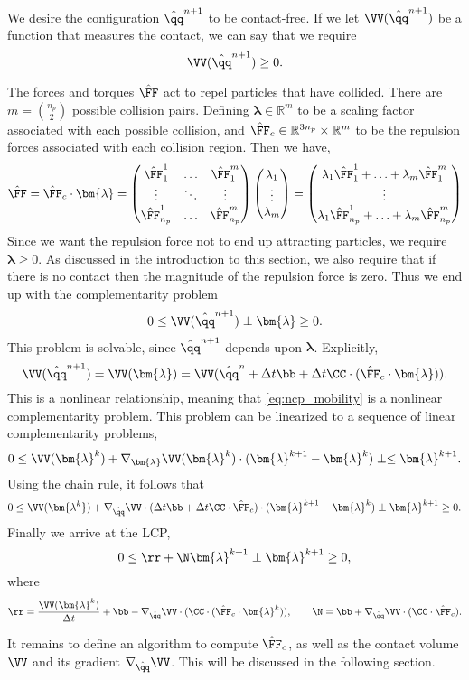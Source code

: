 We desire the configuration $\hat{\qq}^{n+1}$ to be contact-free. If we let $\VV(\hat{\qq}^{n+1})$ be a function that measures the contact, we can say that we require
\[ \VV(\hat{\qq}^{n+1}) \geq 0.\]

The forces and torques $\hat{\FF}$ act to repel particles that have collided. There are $m = \binom{n_p}{2}$ possible collision pairs. Defining $\bm{\lambda}\in \mathbb{R}^m$ to be a scaling factor associated with each possible collision, and $\hat{\FF}_c \in \mathbb{R}^{3n_p}\times \mathbb{R}^m$ to be the repulsion forces associated with each collision region. Then we have,
\[
	\hat{\FF} = \hat{\FF}_c\cdot\bm{\lambda} =  \begin{pmatrix} \hat{\FF}_1^1 & \hdots & \hat{\FF}^{m}_1\\  \vdots & \ddots & \vdots \\ \hat{\FF}_{n_p}^1 & \hdots & \hat{\FF}_{n_p}^m\end{pmatrix} \begin{pmatrix} \lambda_1 \\ \vdots \\ \lambda_m\end{pmatrix} = \begin{pmatrix} \lambda_1 \hat{\FF}_1^1 + \hdots + \lambda_m\hat{\FF}_1^m\\ \vdots \\\lambda_1 \hat{\FF}_{n_p}^1 + \hdots + \lambda_m\hat{\FF}_{n_p}^m\end{pmatrix}
\]
Since we want the repulsion force not to end up attracting particles, we require $\bm{\lambda}\geq 0$. As discussed in the introduction to this section, we also require that if there is no contact then the magnitude of the repulsion force is zero. Thus we end up with the complementarity problem
\begin{equation}\label{eq:ncp_mobility}0 \leq  \VV(\hat{\qq}^{n+1}) \perp \bm{\lambda} \geq 0.\end{equation}
This problem is solvable, since $\hat{\qq}^{n+1}$ depends upon $\bm{\lambda}$. Explicitly,
\[ \VV(\hat{\qq}^{n+1}) = \VV(\bm{\lambda}) =  \VV( \hat{\qq}^n + \Delta t\bb + \Delta t \CC\cdot(\hat{\FF}_c\cdot\bm{\lambda})).\]
This is a nonlinear relationship, meaning that \eqref{eq:ncp_mobility} is a nonlinear complementarity problem. This problem can be linearized to a sequence of linear complementarity problems,
\[ 0\leq \VV(\bm{\lambda}^k) + \nabla_{\bm{\lambda}} \VV(\bm{\lambda}^k)\cdot(\bm{\lambda}^{k+1} - \bm{\lambda}^k) \perp \leq \bm{\lambda}^{k+1}.\]
Using the chain rule, it follows that
\[ 0\leq \VV(\bm{\lambda^k}) + \nabla_{\hat{\qq}}\VV\cdot(\Delta t\bb + \Delta t \CC\cdot\hat{\FF}_c) \cdot(\bm{\lambda}^{k+1} - \bm{\lambda}^k) \perp \bm{\lambda}^{k+1} \geq 0.\]
Finally we arrive at the LCP,
\[ 0\leq \rr + \N\bm{\lambda}^{k+1} \perp \bm{\lambda}^{k+1} \geq 0,\]
where
\[ \rr = \frac{\VV(\bm{\lambda}^k)}{\Delta t} + \bb - \nabla_{\hat{\qq}}\VV \cdot (\CC\cdot(\hat{\FF}_c\cdot\bm{\lambda}^k)),\qquad \N  =\bb+\nabla_{\hat{\qq}}\VV\cdot(\CC\cdot\hat{\FF}_c).\]

It remains to define an algorithm to compute $\hat{\FF}_c$, as well as the contact volume $\VV$ and its gradient $\nabla_{\hat{\qq}} \VV$. This will be discussed in the following section.
